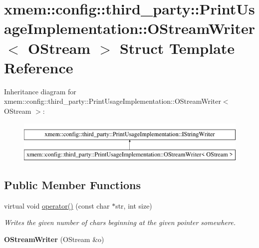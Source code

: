 \hypertarget{structxmem_1_1config_1_1third__party_1_1_print_usage_implementation_1_1_o_stream_writer}{}\section{xmem\+:\+:config\+:\+:third\+\_\+party\+:\+:Print\+Usage\+Implementation\+:\+:O\+Stream\+Writer$<$ O\+Stream $>$ Struct Template Reference}
\label{structxmem_1_1config_1_1third__party_1_1_print_usage_implementation_1_1_o_stream_writer}
Inheritance diagram for xmem\+:\+:config\+:\+:third\+\_\+party\+:\+:Print\+Usage\+Implementation\+:\+:O\+Stream\+Writer$<$ O\+Stream $>$\+:\begin{figure}[H]
\begin{center}
\leavevmode
\includegraphics[height=2.000000cm]{structxmem_1_1config_1_1third__party_1_1_print_usage_implementation_1_1_o_stream_writer}
\end{center}
\end{figure}
\subsection*{Public Member Functions}
\begin{DoxyCompactItemize}
\item 
\hypertarget{structxmem_1_1config_1_1third__party_1_1_print_usage_implementation_1_1_o_stream_writer_a3b530bd8c2066ce1e77ccdd48f593f8d}{}virtual void \hyperlink{structxmem_1_1config_1_1third__party_1_1_print_usage_implementation_1_1_o_stream_writer_a3b530bd8c2066ce1e77ccdd48f593f8d}{operator()} (const char $\ast$str, int size)\label{structxmem_1_1config_1_1third__party_1_1_print_usage_implementation_1_1_o_stream_writer_a3b530bd8c2066ce1e77ccdd48f593f8d}

\begin{DoxyCompactList}\small\item\em Writes the given number of chars beginning at the given pointer somewhere. \end{DoxyCompactList}\item 
\hypertarget{structxmem_1_1config_1_1third__party_1_1_print_usage_implementation_1_1_o_stream_writer_a44255b54f77d5ec3fecc583615bc222d}{}{\bfseries O\+Stream\+Writer} (O\+Stream \&o)\label{structxmem_1_1config_1_1third__party_1_1_print_usage_implementation_1_1_o_stream_writer_a44255b54f77d5ec3fecc583615bc222d}

\end{DoxyCompactItemize}
